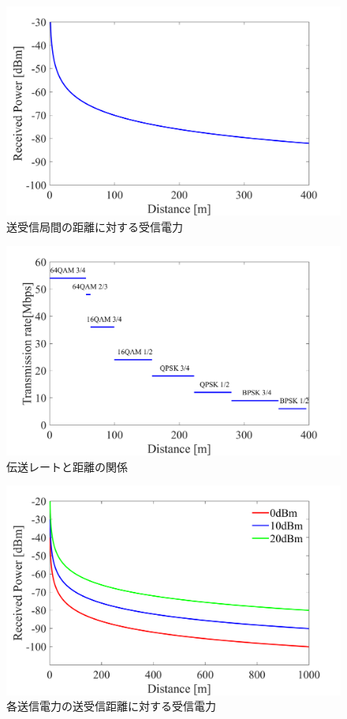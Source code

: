\documentclass[a4paper,10.5pt]{ltjsarticle}
\begin{document}
\begin{figure}[H]
  \centering
  \includegraphics[width=\linewidth]{lfsp_vs_distance.pdf} %
  \caption{送受信局間の距離に対する受信電力}
  \label{fig:Received power_vs_distance} %
\end{figure}


\begin{figure}[H]
  \centering
  \includegraphics[width=\linewidth]{rate_vs_distance.pdf} %
  \caption{伝送レートと距離の関係}
  \label{fig:rate_vs_distance} %
\end{figure}

\begin{figure}[H]
  \centering
  \includegraphics[width=\linewidth]{lfsp_vs_distance_2.pdf} %
  \caption{各送信電力の送受信距離に対する受信電力}
  \label{fig:lfsp_vs_distance_2} %
\end{figure}
\end{document}
